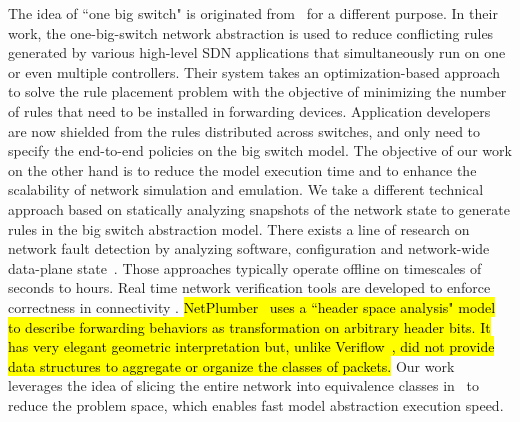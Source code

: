 \label{OBS:Sec:RelatedWorks}

The idea of ``one big switch" is originated from~\mbox{\cite{OneBigSwitchAbstraction}} for a different purpose.
In their work, the one-big-switch network abstraction is used to reduce conflicting rules generated by
various high-level SDN applications that simultaneously run on one or even multiple controllers.
Their system takes an optimization-based approach to solve the rule placement problem with
the objective of minimizing the number of rules that need to be installed in forwarding devices.
Application developers are now shielded from the rules distributed across switches, and only need to specify the end-to-end policies on the big switch model. 
The objective of our work on the other hand is to reduce the model execution time and to
enhance the scalability of network simulation and emulation.
We take a different technical approach based on statically analyzing snapshots of the network state to generate rules in the big switch abstraction model.
There exists a line of research on network fault detection by analyzing software,
configuration and network-wide data-plane state~\cite{Al-Shaer2010,Al-Shaer2009,Anteater2011,xz+05}.
Those approaches typically operate offline on timescales of seconds to hours.
Real time network verification tools are developed to enforce correctness in connectivity \cite{NetPlumber2013,Veriflow}.
\hl{
    NetPlumber~\mbox{\cite{NetPlumber2013}} uses a ``header space analysis" model to
describe forwarding behaviors as transformation on arbitrary header bits.
It has very elegant geometric interpretation but, unlike Veriflow~\mbox{\cite{Veriflow}}, did not
provide data structures to aggregate or organize the classes of packets.
}
\fi
Our work leverages the idea of slicing the entire network into equivalence classes in~\cite{Veriflow}
to reduce the problem space, which enables fast model abstraction execution speed.

